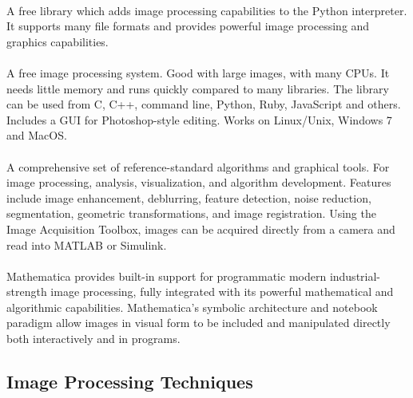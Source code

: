 \documentclass[]{article}
\begin{document}
 \cite{pil} \\

\noindent A free library which adds image processing capabilities to the Python interpreter.  It supports many file formats and provides powerful image processing and graphics capabilities. \\

 \cite{vips} \\

\noindent A free image processing system.  Good with large images, with many CPUs.  It needs little memory and runs quickly compared to many libraries.  The library can be used from C, C++, command line, Python, Ruby, JavaScript and others.  Includes a GUI for Photoshop-style editing. Works on Linux/Unix, Windows 7 and MacOS. \\

 \cite{matlab_ipt} \\ 

\noindent A comprehensive set of reference-standard algorithms and graphical tools.  For image processing, analysis, visualization, and algorithm development.  Features include image enhancement, deblurring, feature detection, noise reduction, segmentation, geometric transformations, and image registration.  Using the Image Acquisition Toolbox, images can be acquired directly from a camera and read into MATLAB or Simulink. \cite{matlab_iat} \\ 


 \cite{mathematica} \\

\noindent Mathematica provides built-in support for programmatic modern industrial-strength image processing, fully integrated with its powerful mathematical and algorithmic capabilities.  Mathematica's symbolic architecture and notebook paradigm allow images in visual form to be included and manipulated directly both interactively and in programs.


	\subsection{Image Processing Techniques}
\end{document}
